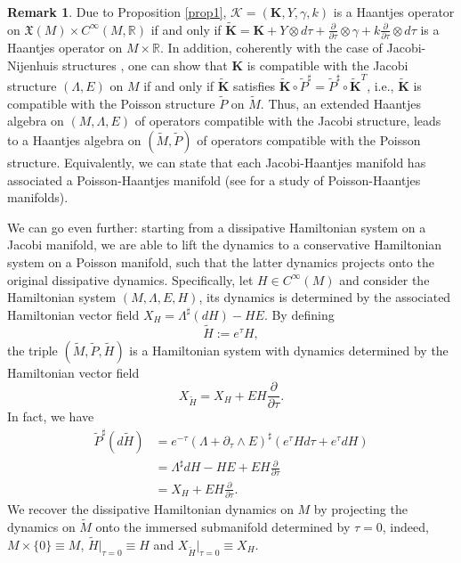 \documentclass[10pt]{amsart}
\numberwithin{equation}{section}
\newcommand{\bs}{\boldsymbol}
\theoremstyle{definition}
\newtheorem{remark}{\textbf{Remark}}
\begin{document}
\begin{remark}
Due to Proposition \ref{prop1}, $\bs{\mathcal{K}}=(\bs{K}, Y, \gamma, k)$ is a Haantjes operator on $\mathfrak{X}(M)\times C^{\infty}(M, \mathbb{R})$ if and only if $\tilde{\bs{K}}=\bs{K}+Y\otimes d\tau+\frac{\partial}{\partial \tau}\otimes\gamma+k\frac{\partial}{\partial \tau}\otimes d\tau$ is a Haantjes operator on $M\times\mathbb{R}$. In addition, coherently with the case of Jacobi-Nijenhuis structures \cite{PNJGP2003}, one can show that $\mathcal{\bs{K}}$ is compatible with the Jacobi structure $(\Lambda,E)$ on $M$ if and only if $\tilde{\bs{K}}$ satisfies $\tilde{\bs{K}}\circ\tilde{P}^{\sharp}=\tilde{P}^{\sharp}\circ\tilde{\bs{K}}^{T}$, i.e., $\tilde{\bs{K}}$ is compatible with the Poisson structure $\tilde{P}$ on $\tilde{M}$. Thus, an extended Haantjes algebra on $(M,\Lambda,E)$ of operators compatible with the Jacobi structure, leads to a Haantjes algebra on $(\tilde{M},\tilde{P})$ of operators compatible with the Poisson structure.  Equivalently, we can state that each Jacobi-Haantjes manifold has associated a Poisson-Haantjes manifold (see \cite{T2018TMP} for a study of Poisson-Haantjes manifolds). 
\end{remark}

We can go even further: starting from a dissipative Hamiltonian system on a Jacobi manifold,  we are able to lift the dynamics to a conservative Hamiltonian system on a Poisson manifold, such that the latter dynamics projects onto the original dissipative dynamics. Specifically, let $H\in C^{\infty}(M)$ and consider the Hamiltonian system $(M,\Lambda,E,H)$, its dynamics is determined by the associated Hamiltonian vector field $X_{H}=\Lambda^{\sharp}(dH)-HE.$ By defining
\begin{equation}
\tilde{H}:=e^{\tau}H,
\end{equation}
the triple $(\tilde{M},\tilde{P},\tilde{H})$ is a Hamiltonian system with dynamics determined by the Hamiltonian vector field
\begin{equation}
X_{\tilde{H}}=X_{H}+EH\frac{\partial}{\partial \tau}.
\end{equation}
In fact, we have
\begin{equation}
\begin{split}
\tilde{P}^{\sharp}(d\tilde{H})&=e^{-\tau}(\Lambda+ \partial_\tau \wedge E)^{\sharp}(e^{\tau}Hd\tau+e^{\tau}dH)\\
&=\Lambda^{\sharp}dH-HE+EH\frac{\partial}{\partial \tau}\\
&=X_{H}+EH\frac{\partial}{\partial \tau}.
\end{split}
\end{equation}
We recover the dissipative Hamiltonian dynamics on $M$ by projecting the dynamics on $\tilde{M}$ onto the immersed submanifold determined by $\tau=0$, indeed, $M\times\lbrace 0\rbrace\equiv M$, $\tilde{H}\vert_{\tau=0}\equiv H$ and $X_{\tilde{H}}\vert_{\tau=0}\equiv X_{H}$.
\vspace{2mm}
\end{document}

